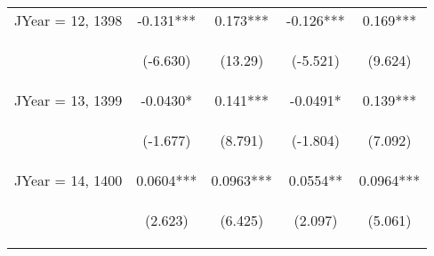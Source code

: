 \documentclass[]{standalone}
\begin{document}
\begin{tabular}{lcccc}
    JYear = 12, 1398 & -0.131***                                      & 0.173***                                       & -0.126***                                      & 0.169***                                       \\
    \vspace{4pt}     & \begin{footnotesize}(-6.630)\end{footnotesize} & \begin{footnotesize}(13.29)\end{footnotesize}  & \begin{footnotesize}(-5.521)\end{footnotesize} & \begin{footnotesize}(9.624)\end{footnotesize}  \\
    JYear = 13, 1399 & -0.0430*                                       & 0.141***                                       & -0.0491*                                       & 0.139***                                       \\
    \vspace{4pt}     & \begin{footnotesize}(-1.677)\end{footnotesize} & \begin{footnotesize}(8.791)\end{footnotesize}  & \begin{footnotesize}(-1.804)\end{footnotesize} & \begin{footnotesize}(7.092)\end{footnotesize}  \\
    JYear = 14, 1400 & 0.0604***                                      & 0.0963***                                      & 0.0554**                                       & 0.0964***                                      \\
    \vspace{4pt}     & \begin{footnotesize}(2.623)\end{footnotesize}  & \begin{footnotesize}(6.425)\end{footnotesize}  & \begin{footnotesize}(2.097)\end{footnotesize}  & \begin{footnotesize}(5.061)\end{footnotesize}  \\

\end{tabular}
\end{document}
